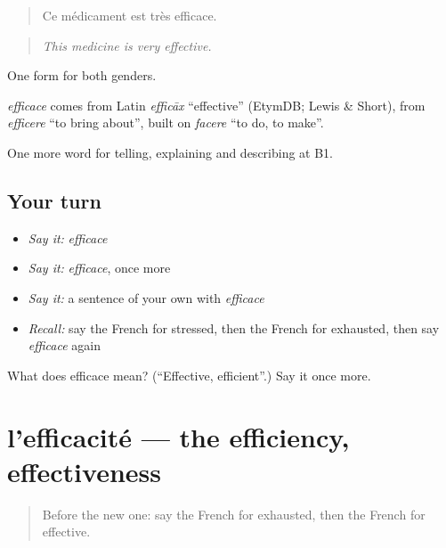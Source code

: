\begin{quote}
Ce médicament est très efficace.
\end{quote}

\begin{quote}
\emph{This medicine is very effective.}
\end{quote}

One form for both genders.

\begin{cousinweb}
\emph{efficace} comes from Latin \emph{efficāx} \textquotedblleft{}effective\textquotedblright{} (EtymDB; Lewis \& Short), from \emph{efficere} \textquotedblleft{}to bring about\textquotedblright{}, built on \emph{facere} \textquotedblleft{}to do, to make\textquotedblright{}.
\end{cousinweb}

\begin{grammarlens}[title={What you've built}]
One more word for telling, explaining and describing at B1.
\end{grammarlens}

\subsection*{Your turn}
\begin{itemize}
\raggedright
  \item \emph{Say it:} \emph{efficace}
  \item \emph{Say it:} \emph{efficace}, once more
  \item \emph{Say it:} a sentence of your own with \emph{efficace}
  \item \emph{Recall:} say the French for stressed, then the French for exhausted, then say \emph{efficace} again
\end{itemize}

\begin{tcolorbox}[breakable,colback=teal!4,colframe=teal!35!black,title={Before you move on}]
What does efficace mean? (\textquotedblleft{}Effective, efficient\textquotedblright{}.) Say it once more.
\end{tcolorbox}
\section[l'efficacité]{l'efficacité — the efficiency, effectiveness}

\label{lesson:FR-C361-efficacite}



\begin{quote}
Before the new one: say the French for exhausted, then the French for effective.
\end{quote}

